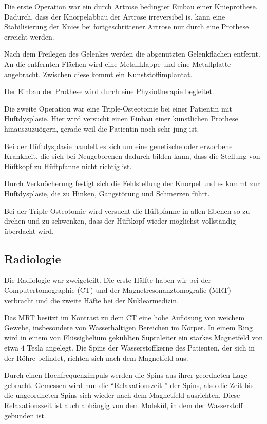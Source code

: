 \documentclass[11pt,a4paper,titlepage]{scrartcl}
\begin{document}
Die erste Operation war ein durch Artrose bedingter Einbau einer Knieprothese. Dadurch, dass der Knorpelabbau der Artrose irreversibel is, kann eine Stabilisierung der Knies bei fortgeschrittener Artrose nur durch eine Prothese erreicht werden.\medskip

Nach dem Freilegen des Gelenkes werden die abgenutzten Gelenkflächen entfernt. An die entfernten Flächen wird eine Metallklappe und eine Metallplatte angebracht. Zwischen diese kommt ein Kunststoffimplantat. \medskip

Der Einbau der Prothese wird durch eine Physiotherapie begleitet. \medskip

Die zweite Operation war eine Triple-Osteotomie bei einer Patientin mit Hüftdysplasie. Hier wird versucht einen Einbau einer künstlichen Prothese hinauszuzuögern, gerade weil die Patientin noch sehr jung ist. \medskip

Bei der Hüftdysplasie handelt es sich um eine genetische oder erworbene Krankheit, die sich bei Neugeborenen dadurch bilden kann, dass die Stellung von Hüftkopf zu Hüftpfanne nicht richtig ist. \medskip

Durch Verknöcherung festigt sich die Fehlstellung der Knorpel und es kommt zur Hüftdysplasie, die zu Hinken, Gangstörung und Schmerzen führt. \medskip

Bei der Triple-Osteotomie wird versucht die Hüftpfanne in allen Ebenen so zu drehen und zu schwenken, dass der Hüftkopf wieder möglichst vollständig überdacht wird. \medskip



\subsection{Radiologie}

Die Radiologie war zweigeteilt. Die erste Hälfte haben wir bei der Computertomographie (CT) und der Magnetresonanztomografie (MRT) verbracht und die zweite Häfte bei der Nuklearmedizin. \medskip

Das MRT besitzt im Kontrast zu dem CT eine hohe Auflösung von weichem Gewebe, insbesondere von Wasserhaltigen Bereichen im Körper. In einem Ring wird in einem von Flüssighelium gekühlten Supraleiter ein starkes Magnetfeld von etwa $4$ Tesla angelegt. Die Spins der Wasserstoffkerne des Patienten, der sich in der Röhre befindet, richten sich nach dem Magnetfeld aus.  \medskip

Durch einen Hochfrequenzimpuls werden die Spins aus ihrer geordneten Lage gebracht. Gemessen wird nun die \enquote{Relaxationszeit } der Spins, also die Zeit bis die ungeordneten Spins sich wieder nach dem Magnetfeld ausrichten. Diese Relaxationszeit ist auch abhängig von dem Molekül, in dem der Wasserstoff gebunden ist. \medskip
\end{document}
